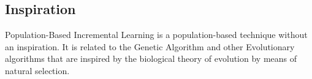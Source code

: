 \subsection{Inspiration}
Population-Based Incremental Learning is a population-based technique without an inspiration. It is related to the Genetic Algorithm and other Evolutionary algorithms that are inspired by the biological theory of evolution by means of natural selection.


